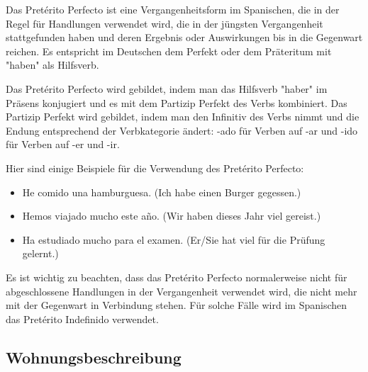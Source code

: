 \documentclass{article}
\begin{document}
Das Pretérito Perfecto ist eine Vergangenheitsform im Spanischen, die in der
Regel für Handlungen verwendet wird, die in der jüngsten Vergangenheit
stattgefunden haben und deren Ergebnis oder Auswirkungen bis in die Gegenwart
reichen. Es entspricht im Deutschen dem Perfekt oder dem Präteritum mit "haben"
als Hilfsverb.

Das Pretérito Perfecto wird gebildet, indem man das Hilfsverb "haber" im
Präsens konjugiert und es mit dem Partizip Perfekt des Verbs kombiniert. Das
Partizip Perfekt wird gebildet, indem man den Infinitiv des Verbs nimmt und die
Endung entsprechend der Verbkategorie ändert: -ado für Verben auf -ar und -ido
für Verben auf -er und -ir.

Hier sind einige Beispiele für die Verwendung des Pretérito Perfecto:
\begin{itemize}
  \item He comido una hamburguesa. (Ich habe einen Burger gegessen.)
  \item Hemos viajado mucho este año. (Wir haben dieses Jahr viel gereist.)
  \item Ha estudiado mucho para el examen. (Er/Sie hat viel für die Prüfung gelernt.)
\end{itemize}

Es ist wichtig zu beachten, dass das Pretérito Perfecto normalerweise nicht für
abgeschlossene Handlungen in der Vergangenheit verwendet wird, die nicht mehr
mit der Gegenwart in Verbindung stehen. Für solche Fälle wird im Spanischen das
Pretérito Indefinido verwendet.

\subsection{Wohnungsbeschreibung}
\end{document}
